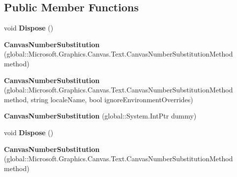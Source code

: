 \subsection*{Public Member Functions}
\begin{DoxyCompactItemize}
\item 
\mbox{\label{class_microsoft_1_1_graphics_1_1_canvas_1_1_text_1_1_canvas_number_substitution_ab79f8bfd20865299806189e031b32db1}} 
void {\bfseries Dispose} ()
\item 
\mbox{\label{class_microsoft_1_1_graphics_1_1_canvas_1_1_text_1_1_canvas_number_substitution_a23cd618feea7309cd4c3797c2969e6f3}} 
{\bfseries Canvas\+Number\+Substitution} (global\+::\+Microsoft.\+Graphics.\+Canvas.\+Text.\+Canvas\+Number\+Substitution\+Method method)
\item 
\mbox{\label{class_microsoft_1_1_graphics_1_1_canvas_1_1_text_1_1_canvas_number_substitution_ae878982d7be90bf2b1ff752454f90f93}} 
{\bfseries Canvas\+Number\+Substitution} (global\+::\+Microsoft.\+Graphics.\+Canvas.\+Text.\+Canvas\+Number\+Substitution\+Method method, string locale\+Name, bool ignore\+Environment\+Overrides)
\item 
\mbox{\label{class_microsoft_1_1_graphics_1_1_canvas_1_1_text_1_1_canvas_number_substitution_a367a017a47cc1914c315d4594f461eaa}} 
{\bfseries Canvas\+Number\+Substitution} (global\+::\+System.\+Int\+Ptr dummy)
\item 
\mbox{\label{class_microsoft_1_1_graphics_1_1_canvas_1_1_text_1_1_canvas_number_substitution_ab79f8bfd20865299806189e031b32db1}} 
void {\bfseries Dispose} ()
\item 
\mbox{\label{class_microsoft_1_1_graphics_1_1_canvas_1_1_text_1_1_canvas_number_substitution_a23cd618feea7309cd4c3797c2969e6f3}} 
{\bfseries Canvas\+Number\+Substitution} (global\+::\+Microsoft.\+Graphics.\+Canvas.\+Text.\+Canvas\+Number\+Substitution\+Method method)

\end{DoxyCompactItemize}
